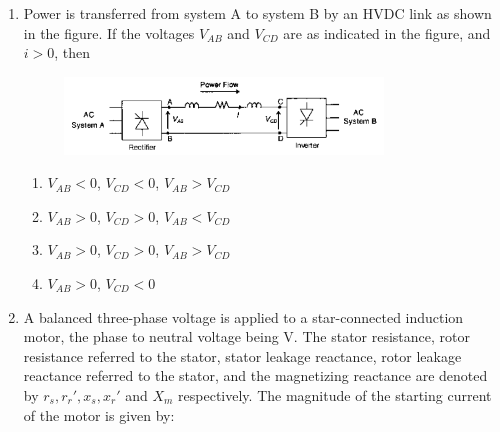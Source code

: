 \documentclass[12pt]{article}
\theoremstyle{remark}
\begin{document}
\begin{enumerate}
\item Power is transferred from system A to system B by an HVDC link as shown in the figure. If the voltages $V_{AB}$ and $V_{CD}$ are as indicated in the figure, and $i>0$, then
\begin{figure}[H]
    \centering
    \includegraphics[width=0.8\textwidth]{Figs/Q14.png}
    \caption{}
    \label{fig:1.8}
\end{figure}
\begin{enumerate}
    \item $V_{AB} < 0$, $V_{CD} < 0$, $V_{AB} > V_{CD}$
    \item $V_{AB} > 0$, $V_{CD} > 0$, $V_{AB} < V_{CD}$
    \item $V_{AB} > 0$, $V_{CD} > 0$, $V_{AB} > V_{CD}$
    \item $V_{AB} > 0$, $V_{CD} < 0$
\end{enumerate}
\hfill{}

\item A balanced three-phase voltage is applied to a star-connected induction motor, the phase to neutral voltage being V. The stator resistance, rotor resistance referred to the stator, stator leakage reactance, rotor leakage reactance referred to the stator, and the magnetizing reactance are denoted by $r_s, r_r', x_s, x_r'$ and $X_m$ respectively. The magnitude of the starting current of the motor is given by:
\begin{enumerate}
\end{enumerate}
\hfill{}


\end{enumerate}
\end{document}
